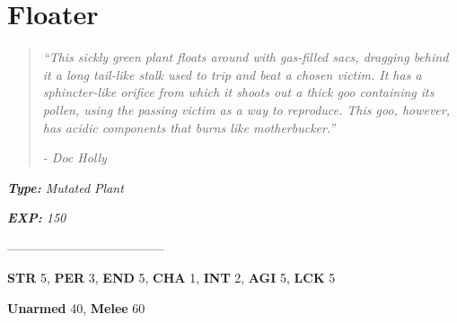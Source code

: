 \documentclass[11pt,a4paper,twocolumn]{book}
\begin{document}
	\section*{Floater}
	\begin{quote}
		\emph{``This sickly green plant floats around with gas-filled sacs, dragging behind it a long tail-like stalk used to trip and beat a chosen victim. It has a sphincter-like orifice from which it shoots out a thick goo containing its pollen, using the passing victim as a way to reproduce. This goo, however, has acidic components that burns like motherbucker.''}
		
		\emph{-	Doc Holly}
	\end{quote}
	
	\noindent
	\emph{\textbf{Type:} Mutated Plant}
	
	\noindent
	\emph{\textbf{EXP:} 150}
	
%		
%	
%		

	--------------------------------------

	\noindent
	\textbf{STR} 5, \textbf{PER} 3, \textbf{END} 5, \textbf{CHA} 1, \textbf{INT} 2, \textbf{AGI} 5, \textbf{LCK} 5
	
	\noindent
	\textbf{Unarmed} 40, \textbf{Melee} 60
	
\end{document}
